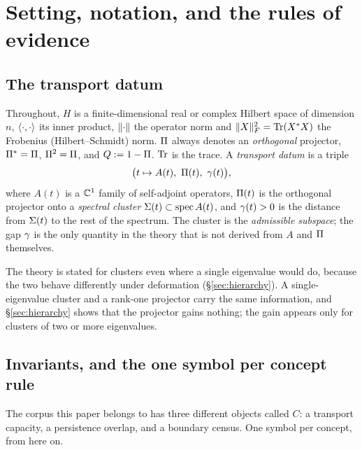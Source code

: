 \section{Setting, notation, and the rules of evidence}\label{sec:setting}

\subsection{The transport datum}

Throughout, $H$ is a finite-dimensional real or complex Hilbert space of dimension $n$,
$\langle\cdot,\cdot\rangle$ its inner product, $\lVert\cdot\rVert$ the operator norm and
$\lVert X\rVert_F^2=\operatorname{Tr}(X^*X)$ the Frobenius (Hilbert--Schmidt) norm. $\Pi$ always denotes an
\emph{orthogonal} projector, $\Pi^*=\Pi$, $\Pi^2=\Pi$, and $Q:=1-\Pi$. $\operatorname{Tr}$ is the trace.
A \emph{transport datum} is a triple
\[
   \bigl(t\mapsto A(t),\ \Pi(t),\ \gamma(t)\bigr),
\]
where $A(t)$ is a $\mathbb{C}^1$ family of self-adjoint operators, $\Pi(t)$ is the orthogonal projector
onto a \emph{spectral cluster} $\Sigma(t)\subset\operatorname{spec}A(t)$, and $\gamma(t)>0$ is the
distance from $\Sigma(t)$ to the rest of the spectrum. The cluster is the \emph{admissible
subspace}; the gap $\gamma$ is the only quantity in the theory that is not derived from $A$ and
$\Pi$ themselves.

\begin{remark}\label{rem:cluster}
The theory is stated for clusters even where a single eigenvalue would do, because the two
behave differently under deformation (\S\ref{sec:hierarchy}). A single-eigenvalue cluster and a
rank-one projector carry the same information, and \S\ref{sec:hierarchy} shows that the
projector gains nothing; the gain appears only for clusters of two or more eigenvalues.
\end{remark}

\subsection{Invariants, and the one symbol per concept rule}

The corpus this paper belongs to has three different objects called $C$: a transport capacity,
a persistence overlap, and a boundary census. One symbol per concept, from here on.

